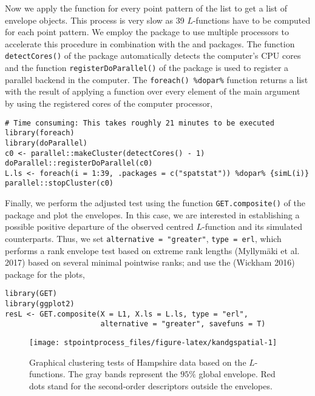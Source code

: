 Now we apply the function for every point pattern of the list to get a list of envelope objects. This process is very slow as 39 \(L\)-functions have to be computed for each point pattern. We employ the package  to use multiple processors to accelerate this procedure in combination with the  and  packages. The function \texttt{detectCores()} of the package  automatically detects the computer's CPU cores and the function \texttt{registerDoParallel()} of the  package is used to register a parallel backend in the computer. The \texttt{foreach()\ \%dopar\%} function returns a list with the result of applying a function over every element of the main argument by using the registered cores of the computer processor,

\begin{verbatim}
# Time consuming: This takes roughly 21 minutes to be executed 
library(foreach)
library(doParallel)
c0 <- parallel::makeCluster(detectCores() - 1)
doParallel::registerDoParallel(c0)
L.ls <- foreach(i = 1:39, .packages = c("spatstat")) %dopar% {simL(i)}
parallel::stopCluster(c0)
\end{verbatim}

Finally, we perform the adjusted test using the function \texttt{GET.composite()} of the  package and plot the envelopes. In this case, we are interested in establishing a possible positive departure of the observed centred \(L\)-function and its simulated counterparts. Thus, we set \texttt{alternative\ =\ "greater"}, \texttt{type\ =\ \textquotesingle{}erl\textquotesingle{}}, which performs a rank envelope test based on extreme rank lengths (Myllymäki et al. 2017) based on several minimal pointwise ranks; and use the  (Wickham 2016) package for the plots,

\begin{verbatim}
library(GET)
library(ggplot2)
resL <- GET.composite(X = L1, X.ls = L.ls, type = "erl", 
                      alternative = "greater", savefuns = T)
\end{verbatim}

\begin{figure}

{\centering \texttt{[image: stpointprocess\_files/figure-latex/kandgspatial-1]} 

}

\caption{Graphical clustering tests of Hampshire data based on the $L$-functions. The gray bands represent the $95\%$ global envelope. Red dots stand for the second-order descriptors outside the envelopes.}\label{fig:kandgspatial}
\end{figure}


